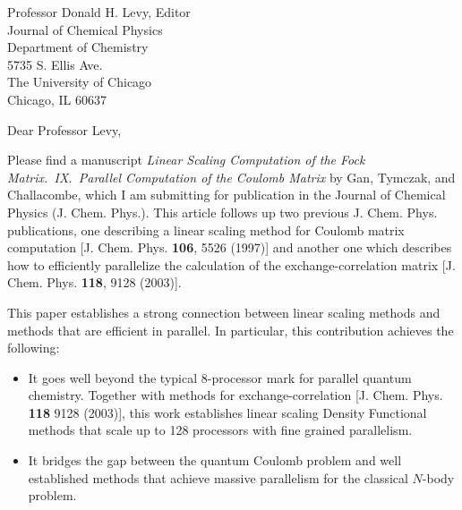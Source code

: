 
\pagestyle{empty}

\signature{Chee Kwan Gan}

\address{
Dr.~Chee Kwan Gan \\
(ckgan@lanl.gov) \\
Theoretical Division \\
Group T-12, MS B268 \\
Los Alamos National Laboratory \\
Los Alamos, NM 87545 }

\date{June 3, 2004}

\begin{letter}{
Professor Donald H. Levy, Editor\\
Journal of Chemical Physics\\
Department of Chemistry\\
5735 S. Ellis Ave.\\
The University of Chicago\\
Chicago, IL 60637}

\opening{Dear Professor Levy,}

Please find a manuscript {\em Linear Scaling Computation of the Fock
Matrix.~IX.~Parallel Computation of the Coulomb Matrix} by Gan,
Tymczak, and Challacombe, which I am submitting for publication in the
Journal of Chemical Physics (J. Chem. Phys.). This article follows up two
previous J. Chem. Phys. publications, one describing a linear scaling method for
Coulomb matrix computation [J. Chem. Phys. {\bf 106}, 5526 (1997)] and
another one which describes how to efficiently parallelize the calculation
of the exchange-correlation matrix [J. Chem. Phys. {\bf 118}, 9128
(2003)].

This paper establishes a
strong connection between linear scaling methods and methods that are
efficient in parallel. In particular, this contribution achieves the following:


\begin{itemize}
\item  It goes well beyond the typical 8-processor mark
       for parallel quantum chemistry.  Together with methods for 
       exchange-correlation [J. Chem. Phys. {\bf 118} 9128
       (2003)], this work establishes linear scaling Density
       Functional  methods that scale up to 128 processors with fine 
       grained parallelism. 

\item It bridges the gap between the quantum Coulomb problem and 
      well established methods that achieve massive parallelism for the
      classical $N$-body problem.


\end{itemize}
\end{letter}
